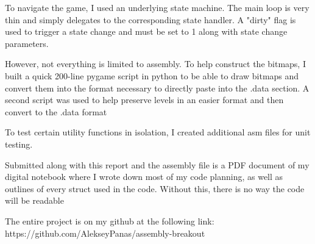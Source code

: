 \documentclass{article}
\begin{document}
To navigate the game, I used an underlying state machine. The main loop is very thin and simply delegates to the corresponding state handler. A "dirty" flag is used to trigger a state change and must be set to 1 along with state change parameters. 

However, not everything is limited to assembly. To help construct the bitmaps, I built a quick 200-line pygame script in python to be able to draw bitmaps and convert them into the format necessary to directly paste into the .data section. A second script was used to help preserve levels in an easier format and then convert to the .data format

To test certain utility functions in isolation, I created additional asm files for unit testing.

Submitted along with this report and the assembly file is a PDF document of my digital notebook where I wrote down most of my code planning, as well as outlines of every struct used in the code. Without this, there is no way the code will be readable

The entire project is on my github at the following link: https://github.com/AlekseyPanas/assembly-breakout 
\end{document}
